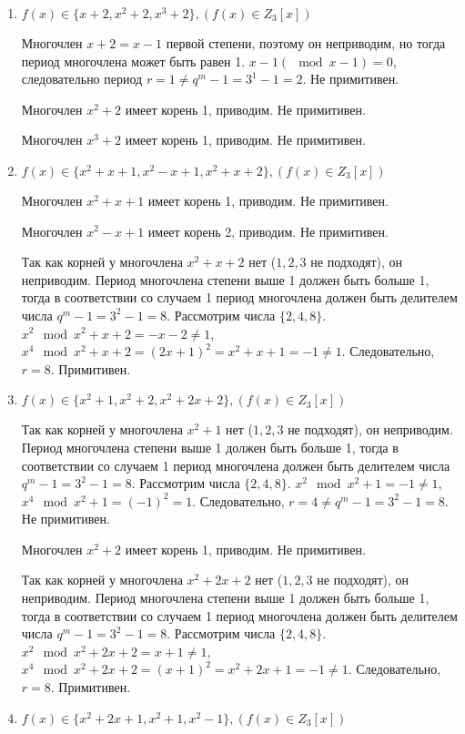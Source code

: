 \documentclass[utf8x, 14pt]{G7-32} %
\begin{document}
\begin{enumerate}
    \item $f(x)\in\{x+2, x^2+2, x^3+2\}, (f(x)\in Z_3[x])$
    
     Многочлен $x+2 = x-1$ первой степени, поэтому он неприводим, но тогда период многочлена может быть равен 1. $x - 1 (\mod{x - 1}) = 0$, следовательно период $r = 1 \neq q^m - 1 = 3^1 -1 = 2$. Не примитивен.
     
     Многочлен $ x^2+2$ имеет корень 1, приводим. Не примитивен.
     
     Многочлен $ x^3+2$ имеет корень 1, приводим. Не примитивен.

    \item $f(x)\in\{x^2+x+1, x^2-x+1, x^2+x+2\}, (f(x)\in Z_3[x])$
    
    Многочлен $ x^2+x+1$ имеет корень 1, приводим. Не примитивен.
    
    Многочлен $ x^2-x+1$ имеет корень 2, приводим. Не примитивен.
    
    Так как корней у многочлена $x^2+x+2$ нет ($1,2,3$ не подходят), он неприводим. Период многочлена степени выше 1 должен быть больше 1, тогда в соответствии со случаем 1 период многочлена должен быть делителем числа $q^m -1 = 3^2 -1 = 8$. Рассмотрим числа $\{2, 4, 8\}$. $x^2 \mod x^2 + x +2 = - x - 2 \neq 1$,  $x^4 \mod x^2 + x +2 = (2x + 1)^2 = x^2 + x + 1 = - 1 \neq 1$. Следовательно, $r=8$. Примитивен.

    \item $f(x)\in\{x^2+1, x^2+2, x^2+2x+2\}, (f(x)\in Z_3[x])$
    
    Так как корней у многочлена $x^2+1$ нет ($1,2,3$ не подходят), он неприводим. Период многочлена степени выше 1 должен быть больше 1, тогда в соответствии со случаем 1 период многочлена должен быть делителем числа $q^m -1 = 3^2 -1 = 8$. Рассмотрим числа $\{2, 4, 8\}$. $x^2 \mod x^2 + 1 = -1 \neq 1$,  $x^4 \mod x^2 + 1 = (-1)^2 = 1$. Следовательно, $r=4\neq q^m -1 = 3^2 -1 = 8$. Не примитивен.
    
    Многочлен $ x^2+2$ имеет корень 1, приводим. Не примитивен.
    
    Так как корней у многочлена $x^2+2x+2$ нет ($1,2,3$ не подходят), он неприводим. Период многочлена степени выше 1 должен быть больше 1, тогда в соответствии со случаем 1 период многочлена должен быть делителем числа $q^m -1 = 3^2 -1 = 8$. Рассмотрим числа $\{2, 4, 8\}$. $x^2 \mod x^2 + 2x +2 = x +1 \neq 1$,  $x^4 \mod x^2 + 2x +2 = (x +1)^2 = x^2 + 2x + 1 = - 1 \neq 1$. Следовательно, $r=8$. Примитивен.

    \item $f(x)\in\{x^2+2x+1, x^2+1, x^2-1\}, (f(x)\in Z_3[x])$
    

\end{enumerate}
\end{document}
